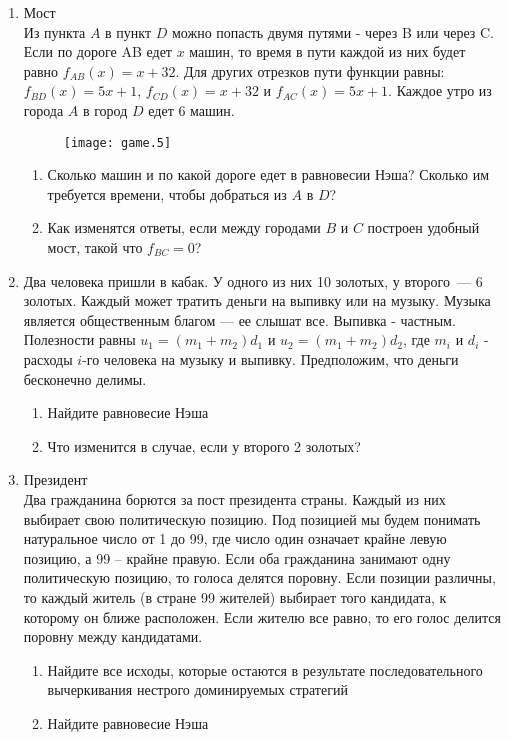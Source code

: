\documentclass[pdftex,12pt,a4paper]{article}
\begin{document}
\begin{enumerate}
\item Мост \\
Из пункта $A$ в пункт $D$ можно попасть двумя путями - через B или
через C. Если по дороге AB едет $x$ машин, то время в пути каждой
из них будет равно $f_{AB}(x)=x+32$. Для других отрезков пути
функции равны: $f_{BD}(x)=5x+1$, $f_{CD}(x)=x+32$ и
$f_{AC}(x)=5x+1$.
Каждое утро из города $A$ в город $D$ едет 6 машин. \\
\begin{figure}[h]
    \texttt{[image: game.5]}
\end{figure} 
\begin{enumerate}
\item Сколько машин и по какой дороге едет в равновесии Нэша?
Сколько им требуется времени, чтобы добраться из $A$ в $D$? 
\item Как изменятся ответы, если между городами $B$ и $C$ построен
удобный мост, такой что $f_{BC}=0$? 
\end{enumerate}

\item Два человека пришли в кабак. У одного из них 10 золотых, у второго~--- 6 золотых. Каждый может тратить деньги на выпивку или на музыку.
Музыка является общественным благом --- ее слышат все. Выпивка -
частным. Полезности равны $u_{1}=(m_{1}+m_{2})d_{1}$ и
$u_{2}=(m_{1}+m_{2})d_{2}$, где $m_{i}$ и $d_{i}$ - расходы $i$-го
человека на музыку и выпивку. Предположим, что деньги бесконечно
делимы. 
\begin{enumerate}
\item Найдите равновесие Нэша 
\item Что изменится в случае, если у второго 2 золотых? 
\end{enumerate}

\item Президент \\
Два гражданина борются за пост президента страны. Каждый из них выбирает свою политическую позицию. Под позицией мы будем понимать натуральное число от 1 до 99, где число один означает крайне левую позицию, а 99 – крайне правую. Если оба гражданина занимают одну политическую позицию, то голоса делятся поровну. Если позиции различны, то каждый житель (в стране 99 жителей) выбирает того кандидата, к которому он ближе расположен. Если жителю все равно, то его голос делится поровну между кандидатами.
\begin{enumerate}
\item Найдите все исходы, которые остаются в результате последовательного вычеркивания нестрого доминируемых стратегий
\item Найдите равновесие Нэша
\end{enumerate}


\end{enumerate}
\end{document}
